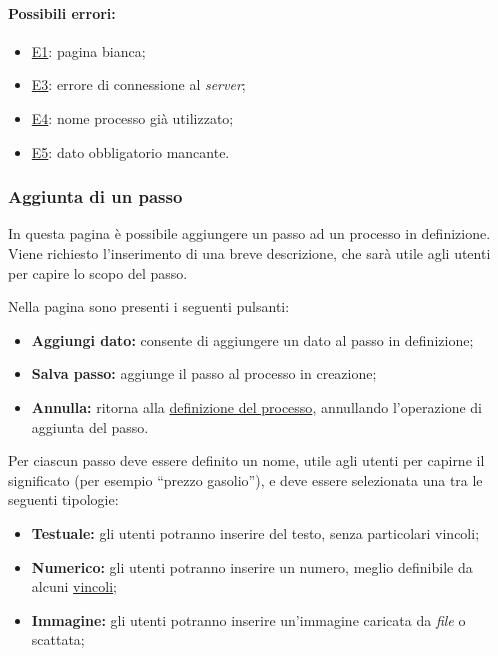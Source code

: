 \paragraph*{Possibili errori:}
\begin{itemize}
\item \hyperref[e1]{E1}: pagina bianca;
\item \hyperref[e3]{E3}: errore di connessione al \textit{server};
\item \hyperref[e4]{E4}: nome processo già utilizzato;
\item \hyperref[e5]{E5}: dato obbligatorio mancante.
\end{itemize}

\subsubsection{Aggiunta di un passo}
\label{addstep}

In questa pagina è possibile aggiungere un passo ad un processo in definizione.
Viene richiesto l'inserimento di una breve descrizione, che sarà utile agli utenti per capire lo scopo del passo.

Nella pagina sono presenti i seguenti pulsanti:
\begin{itemize}
\item \textbf{Aggiungi dato:} consente di aggiungere un dato al passo in definizione;
\item \textbf{Salva passo:} aggiunge il passo al processo in creazione;
\item \textbf{Annulla:} ritorna alla \hyperref[newprocess]{definizione del processo}, annullando l'operazione di aggiunta del passo.
\end{itemize}

Per ciascun passo deve essere definito un nome, utile agli utenti per capirne il significato (per esempio ``prezzo gasolio''), e deve essere selezionata una tra le seguenti tipologie:
\begin{itemize}
\item \textbf{Testuale:} gli utenti potranno inserire del testo, senza particolari vincoli;
\item \textbf{Numerico:} gli utenti potranno inserire un numero, meglio definibile da alcuni \hyperref[vincoli]{vincoli};
\item \textbf{Immagine:} gli utenti potranno inserire un'immagine caricata da \textit{file} o scattata;
\end{itemize}

